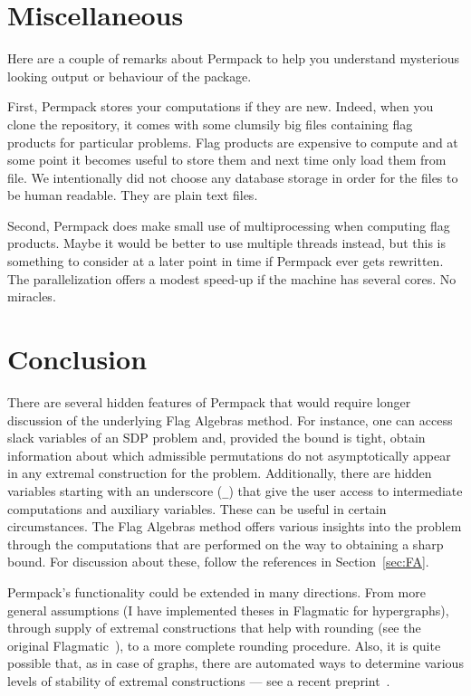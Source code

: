 \documentclass[12pt, a4paper, twoside]{report}
\begin{document}
\section{Miscellaneous}
\label{sec:permpack-misc}
Here are a couple of remarks about Permpack to help you understand mysterious looking output or behaviour of the package.

First, Permpack stores your computations if they are new. Indeed, when you clone the repository, it comes with some clumsily big files containing flag products for particular problems. Flag products are expensive to compute and at some point it becomes useful to store them and next time only load them from file. We intentionally did not choose any database storage in order for the files to be human readable. They are plain text files. 

Second, Permpack does make small use of multiprocessing when computing flag products. Maybe it would be better to use multiple threads instead, but this is something to consider at a later point in time if Permpack ever gets rewritten. The parallelization offers a modest speed-up if the machine has several cores. No miracles.

\section{Conclusion}

There are several hidden features of Permpack that would require longer discussion of the underlying Flag Algebras method. For instance, one can access slack variables of an SDP problem and, provided the bound is tight, obtain information about which admissible permutations do not asymptotically appear in any extremal construction for the problem. Additionally, there are hidden variables starting with an underscore (\texttt{\_}) that give the user access to intermediate computations and auxiliary variables. These can be useful in certain circumstances. The Flag Algebras method offers various insights into the problem through the computations that are performed on the way to obtaining a sharp bound. For discussion about these, follow the references in Section~\ref{sec:FA}. 

Permpack's functionality could be extended in many directions. From more general assumptions (I have implemented theses in Flagmatic for hypergraphs), through supply of extremal constructions that help with rounding (see the original Flagmatic~\cite{flagmatic}), to a more complete rounding procedure. Also, it is quite possible that, as in case of graphs, there are automated ways to determine various levels of stability of extremal constructions --- see a recent preprint~\cite{olegmekostas}. 
\end{document}
